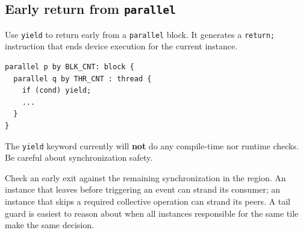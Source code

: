 \subsection*{Early return from \texttt{parallel}}

Use \texttt{yield} to return early from a \texttt{parallel} block. It generates a \texttt{return;} instruction that ends device execution for the current instance.

\begin{lstlisting}[language=croqtile,caption={Early return from parallel}]
parallel p by BLK_CNT: block {
  parallel q by THR_CNT : thread {
    if (cond) yield;
    ...
  }
}
\end{lstlisting}

\begin{pitfall}
The \texttt{yield} keyword currently will \textbf{not} do any compile-time nor runtime checks. Be careful about synchronization safety.

\end{pitfall}

Check an early exit against the remaining synchronization in the region. An instance that leaves before triggering an event can strand its consumer; an instance that skips a required collective operation can strand its peers. A tail guard is easiest to reason about when all instances responsible for the same tile make the same decision.
